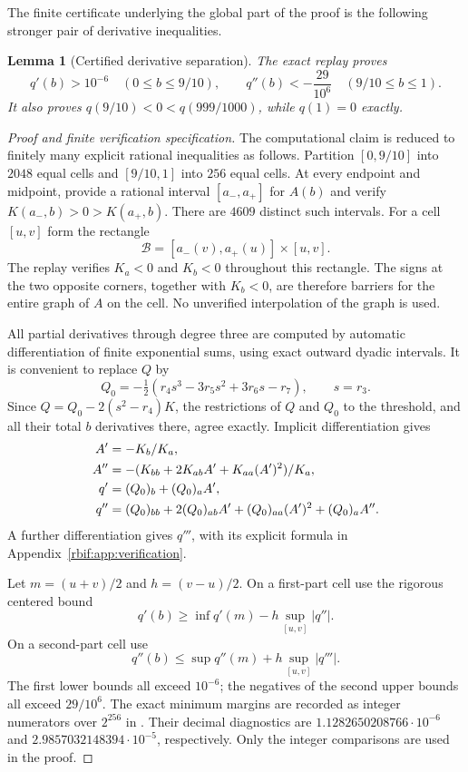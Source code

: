 \documentclass[11pt,a4paper]{article}
\newtheorem{lemma}[theorem]{Lemma}
\theoremstyle{definition}\newtheorem{definition}[theorem]{Definition}
\theoremstyle{remark}\newtheorem{remark}[theorem]{Remark}
\numberwithin{equation}{section}
\begin{document}
The finite certificate underlying the global part of the proof is the
following stronger pair of derivative inequalities.
\begin{lemma}[Certified derivative separation]
\label{rbif:lem:separation}
The exact replay proves
\begin{equation}
 q'(b)>10^{-6}\quad(0\le b\le9/10),\qquad
 q''(b)<-\frac{29}{10^6}\quad(9/10\le b\le1).
 \label{rbif:eq:separation}
\end{equation}
It also proves $q(9/10)<0<q(999/1000)$, while $q(1)=0$ exactly.
\end{lemma}
\begin{proof}[Proof and finite verification specification]
The computational claim is reduced to finitely many explicit rational
inequalities as follows. Partition $[0,9/10]$ into $2048$ equal cells
and $[9/10,1]$ into $256$ equal cells. At every endpoint and midpoint,
provide a rational interval $[a_-,a_+]$ for $A(b)$ and verify
$K(a_-,b)>0>K(a_+,b)$. There are $4609$ distinct such intervals.
For a cell $[u,v]$ form the rectangle
\[
 \mathcal B=[a_-(v),a_+(u)]\times[u,v].
\]
The replay verifies $K_a<0$ and $K_b<0$ throughout this rectangle.
The signs at the two opposite corners, together with $K_b<0$, are
therefore barriers for the entire graph of $A$ on the cell. No unverified
interpolation of the graph is used.

All partial derivatives through degree three are computed by automatic
differentiation of finite exponential sums, using exact outward dyadic
intervals. It is convenient to replace $Q$ by
\begin{equation}
 Q_0=-\tfrac12(r_4s^3-3r_5s^2+3r_6s-r_7),\qquad s=r_3.
 \label{rbif:eq:Q0}
\end{equation}
Since $Q=Q_0-2(s^2-r_4)K$, the restrictions of $Q$ and $Q_0$ to the
threshold, and all their total $b$ derivatives there, agree exactly.
Implicit differentiation gives
\begin{align}
 A'&=-K_b/K_a,\notag\\
 A''&=-(K_{bb}+2K_{ab}A'+K_{aa}(A')^2)/K_a,\label{rbif:eq:implicitdiff}\\
 q'&=(Q_0)_b+(Q_0)_aA',\notag\\
 q''&=(Q_0)_{bb}+2(Q_0)_{ab}A'+(Q_0)_{aa}(A')^2+(Q_0)_aA''.
 \notag
\end{align}
A further differentiation gives $q'''$, with its explicit formula in
Appendix~\ref{rbif:app:verification}.

Let $m=(u+v)/2$ and $h=(v-u)/2$. On a first-part cell use the rigorous
centered bound
\[
 q'(b)\ge \inf q'(m)-h\sup_{[u,v]}|q''|.
\]
On a second-part cell use
\[
 q''(b)\le \sup q''(m)+h\sup_{[u,v]}|q'''|.
\]
The first lower bounds all exceed $10^{-6}$; the negatives of the second
upper bounds all exceed $29/10^6$. The exact minimum margins are recorded
as integer numerators over $2^{256}$ in .
Their decimal diagnostics are $1.1282650208766\cdot10^{-6}$ and
$2.9857032148394\cdot10^{-5}$, respectively. Only the integer comparisons
are used in the proof.


\end{proof}
\end{document}
